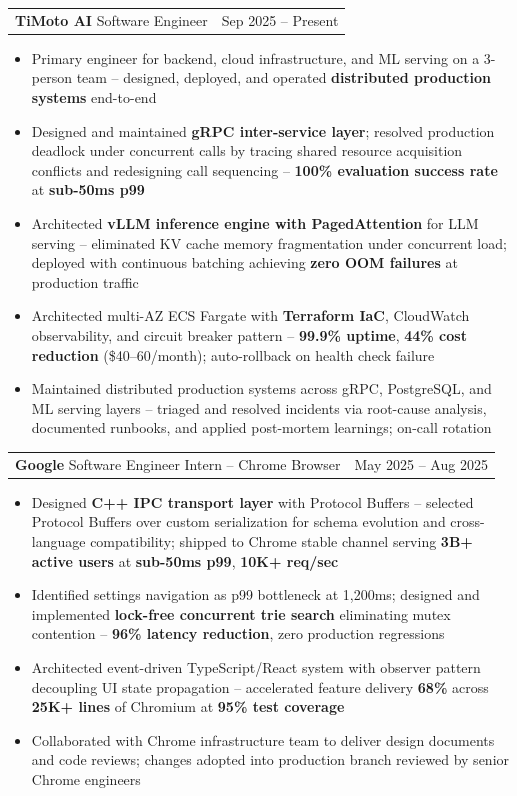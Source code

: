 \documentclass[letterpaper,11pt]{article}
\makeatletter
\newcommand{\resumeItem}[1]{
  \item\small{{#1 \vspace{-2pt}}}
}
\newcommand{\resumeSubheadingShortSplit}[3]{%
  \vspace{-2pt}\item
    \begin{tabular*}{0.98\textwidth}[t]{l@{\extracolsep{\fill}}r}
      {\normalsize\textbf{#1}} \textbar{} {\normalsize #2} & {\normalsize #3} \\
    \end{tabular*}\vspace{-7pt}
}
\newcommand{\resumeItemListStart}{\begin{itemize}}
\newcommand{\resumeItemListEnd}{\end{itemize}\vspace{-5pt}}
\makeatother
\begin{document}
    \resumeSubheadingShortSplit
      {TiMoto AI}{Software Engineer}{Sep 2025 -- Present}
        \resumeItemListStart
          \resumeItem{Primary engineer for backend, cloud infrastructure, and ML serving on a 3-person team -- designed, deployed, and operated \textbf{distributed production systems} end-to-end}
          \resumeItem{Designed and maintained \textbf{gRPC inter-service layer}; resolved production deadlock under concurrent calls by tracing shared resource acquisition conflicts and redesigning call sequencing --
      \textbf{100\% evaluation success rate} at \textbf{sub-50ms p99}}
          \resumeItem{Architected \textbf{vLLM inference engine with PagedAttention} for LLM serving -- eliminated KV cache memory fragmentation under concurrent load; deployed with continuous batching achieving \textbf{zero OOM failures} at production traffic}
          \resumeItem{Architected multi-AZ ECS Fargate with \textbf{Terraform IaC}, CloudWatch observability, and circuit breaker pattern -- \textbf{99.9\% uptime}, \textbf{44\% cost reduction} (\$40--60/month); auto-rollback on health check failure}
          \resumeItem{Maintained distributed production systems across gRPC, PostgreSQL, and ML serving layers -- triaged and resolved incidents via root-cause analysis, documented runbooks, and applied post-mortem learnings; on-call rotation}
      \resumeItemListEnd

    \resumeSubheadingShortSplit
      {Google}{Software Engineer Intern -- Chrome Browser}{May 2025 -- Aug 2025}
      \resumeItemListStart
        \resumeItem{Designed \textbf{C++ IPC transport layer} with Protocol Buffers -- selected Protocol Buffers over custom serialization for schema evolution and cross-language compatibility; shipped to Chrome stable channel serving \textbf{3B+ active users} at \textbf{sub-50ms p99}, \textbf{10K+ req/sec}}
        \resumeItem{Identified settings navigation as p99 bottleneck at 1,200ms; designed and implemented \textbf{lock-free concurrent trie search} eliminating mutex contention -- \textbf{96\% latency reduction}, zero production regressions}
        \resumeItem{Architected event-driven TypeScript/React system with observer pattern decoupling UI state propagation -- accelerated feature delivery \textbf{68\%} across \textbf{25K+ lines} of Chromium at \textbf{95\% test coverage}}
        \resumeItem{Collaborated with Chrome infrastructure team to deliver design documents and code reviews; changes adopted into production branch reviewed by senior Chrome engineers}
      \resumeItemListEnd
\end{document}
